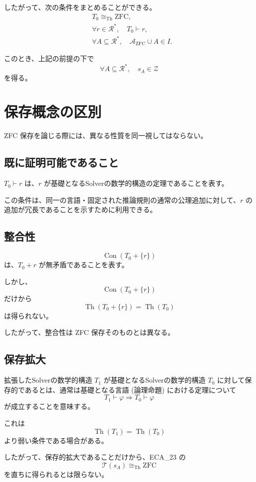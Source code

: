 \documentclass[a4paper,11pt]{article}
\begin{document}
したがって、次の条件をまとめることができる。
\[
\boxed{
\begin{aligned}
&T_0\cong_{\mathrm{Th}}\mathrm{ZFC},\\
&\forall r\in\mathcal{R}^*,\quad T_0\vdash r,\\
&\forall A\subseteq\mathcal{R}^*,\quad
\mathcal{A}_{\mathrm{ZFC}}\cup A\in I.
\end{aligned}}
\]

このとき、上記の前提の下で
\[
\forall A\subseteq\mathcal{R}^*,\quad s_A\in\mathcal{Z}
\]
を得る。

\section{保存概念の区別}
ZFC 保存を論じる際には、異なる性質を同一視してはならない。

\subsection{既に証明可能であること}
$T_0\vdash r$ は、$r$ が基礎となるSolverの数学的構造の定理であることを表す。

この条件は、同一の言語・固定された推論規則の通常の公理追加に対して、$r$ の追加が冗長であることを示すために利用できる。

\subsection{整合性}

\[
\operatorname{Con}(T_0+\{r\})
\]
は、$T_0+r$ が無矛盾であることを表す。

しかし、
\[
\operatorname{Con}(T_0+\{r\})
\]
だけから
\[
\operatorname{Th}(T_0+\{r\})
=
\operatorname{Th}(T_0)
\]
は得られない。

したがって、整合性は ZFC 保存そのものとは異なる。

\subsection{保存拡大}
拡張したSolverの数学的構造 $T_1$ が基礎となるSolverの数学的構造 $T_0$ に対して保存的であるとは、通常は基礎となる言語 (論理命題) における定理について
\[
T_1\vdash\varphi
\Longrightarrow
T_0\vdash\varphi
\]
が成立することを意味する。

これは
\[
\operatorname{Th}(T_1)=\operatorname{Th}(T_0)
\]
より弱い条件である場合がある。

したがって、保存的拡大であることだけから、ECA_23 の
\[
\mathcal{T}(s_A)\cong_{\mathrm{Th}}\mathrm{ZFC}
\]
を直ちに得られるとは限らない。
\end{document}
